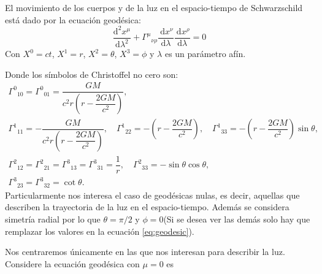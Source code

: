 \noindent El movimiento de los cuerpos y de la luz en el espacio-tiempo de Schwarzschild está dado por la ecuación geodésica:
\begin{equation}
    \frac{\mathrm{d}^2 x^\mu}{\mathrm{d} \lambda^2}+\Gamma^\mu{ }_{\nu \rho} \frac{\mathrm{~d} x^\nu}{\mathrm{d} \lambda} \frac{\mathrm{~d} x^\rho}{\mathrm{d} \lambda}=0
    \label{eq:geodesic}
\end{equation}
Con $X^0 = ct$, $X^1 = r$, $X^2 = \theta$, $X^3 = \phi$ y $\lambda$ es un parámetro afín.

Donde los símbolos de Christoffel no cero son:
$$
    \begin{array}{l}
        \Gamma^0{ }_{10}=\Gamma^0{ }_{01}=\dfrac{G M}{c^2 r\left(r - \dfrac{2 G M}{c^2}\right)},                                                                                                                       \\
        \Gamma^1{ }_{11}=-\dfrac{G M}{c^2 r\left(r - \dfrac{2 G M}{c^2}\right)}, \quad \Gamma^1{ }_{22}=-\left(r - \dfrac{2 G M}{c^2}\right), \quad \Gamma^1{ }_{33}=-\left(r - \dfrac{2 G M}{c^2}\right) \sin \theta, \\
        \Gamma^2{ }_{12}=\Gamma^2{ }_{21}=\Gamma^3{ }_{13}=\Gamma^3{ }_{31}=\dfrac{1}{r}, \quad \Gamma^2{ }_{33}=-\sin \theta \cos \theta,                                                                             \\
        \Gamma^3{ }_{23}=\Gamma^3{ }_{32}=\cot \theta.
    \end{array}
$$
Particularmente nos interesa el caso de geodésicas nulas, es decir, aquellas que describen la trayectoria de la luz en el espacio-tiempo. Además se considera simetría radial por lo que $\theta=\pi/2$ y $\phi=0$(Si se desea ver las demás solo hay que remplazar los valores en la ecuación \ref{eq:geodesic}).

Nos centraremos únicamente en las que nos interesan para describir la luz. Considere  la ecuación geodésica con $\mu=0$ es


